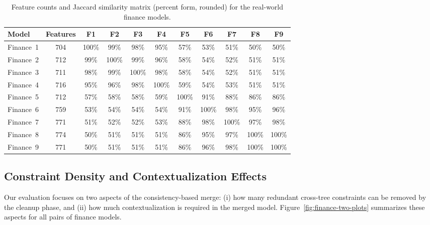 \documentclass{ceurart}
\begin{document}
\FloatBarrier
\begin{table}[t]
\caption{Feature counts and Jaccard similarity matrix (percent form, rounded) for the real-world finance models.}
\centering
\small
\begin{tabular}{l c c c c c c c c c c}
\toprule
\textbf{Model} 
& \textbf{Features} 
& \textbf{F1} & \textbf{F2} & \textbf{F3} & \textbf{F4} 
& \textbf{F5} & \textbf{F6} & \textbf{F7} & \textbf{F8} & \textbf{F9} \\
\midrule
Finance~1 
& 704 
& 100\% & 99\% & 98\% & 95\% & 57\% & 53\% & 51\% & 50\% & 50\% \\

Finance~2 
& 712
& 99\% & 100\% & 99\% & 96\% & 58\% & 54\% & 52\% & 51\% & 51\% \\

Finance~3 
& 711
& 98\% & 99\% & 100\% & 98\% & 58\% & 54\% & 52\% & 51\% & 51\% \\

Finance~4 
& 716
& 95\% & 96\% & 98\% & 100\% & 59\% & 54\% & 53\% & 51\% & 51\% \\

Finance~5 
& 712
& 57\% & 58\% & 58\% & 59\% & 100\% & 91\% & 88\% & 86\% & 86\% \\

Finance~6 
& 759
& 53\% & 54\% & 54\% & 54\% & 91\% & 100\% & 98\% & 95\% & 96\% \\

Finance~7 
& 771
& 51\% & 52\% & 52\% & 53\% & 88\% & 98\% & 100\% & 97\% & 98\% \\

Finance~8 
& 774
& 50\% & 51\% & 51\% & 51\% & 86\% & 95\% & 97\% & 100\% & 100\% \\

Finance~9 
& 771
& 50\% & 51\% & 51\% & 51\% & 86\% & 96\% & 98\% & 100\% & 100\% \\
\bottomrule
\end{tabular}
\label{tab:finance_compact_percent}
\end{table}
\FloatBarrier

\subsection{Constraint Density and Contextualization Effects}
Our evaluation focuses on two aspects of the
consistency-based merge: (i) how many
redundant cross-tree constraints can be removed by the cleanup phase,
and (ii) how much contextualization is required in the merged model.
Figure~\ref{fig:finance-two-plots} summarizes these aspects for all
pairs of finance models.
\end{document}

